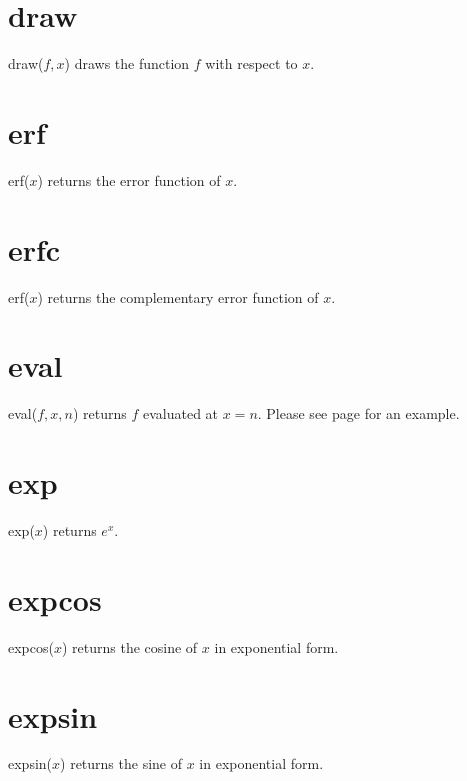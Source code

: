 \documentclass[12pt,openany]{report}
\begin{document}
\section*{draw}
draw($f,x$) draws the function $f$ with respect to $x$.

\section*{erf}
erf($x$) returns the error function of $x$.

\section*{erfc}
erf($x$) returns the complementary error function of $x$.

\section*{eval}
eval($f,x,n$) returns $f$ evaluated at $x=n$.
Please see page \pageref{integral} for an example.

\section*{exp}
exp($x$) returns $e^x$.

\section*{expcos}
expcos($x$) returns the cosine of $x$ in exponential form.

\section*{expsin}
expsin($x$) returns the sine of $x$ in exponential form.
\end{document}
